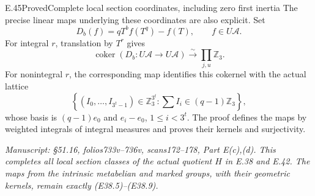 \begin{statement}{E.45}{Proved}{Complete local section coordinates, including zero first inertia}
The precise linear maps underlying these
coordinates are also explicit. Set
\[
 D_b(f)=qT^bf(T^q)-f(T),\qquad f\in U\mathscr A.
 \tag{E45.6}
\]
For integral $r$, translation by $T^r$
gives
\[
 \operatorname{coker}(D_b:U\mathscr A\to U\mathscr A)
     \xrightarrow{\sim}
             \prod_{j,u}\mathbb Z_3.
 \tag{E45.7}
\]
For nonintegral $r$, the corresponding
map identifies this cokernel with the
actual lattice
\[
 \left\{(I_0,\ldots,I_{3^t-1})\in\mathbb Z_3^{3^t}:
                 \sum I_i\in(q-1)\mathbb Z_3\right\},
 \tag{E45.8}
\]
whose basis is $(q-1)e_0$ and
$e_i-e_0$, $1\le i<3^t$. The proof
defines the maps by weighted integrals
of integral measures and proves their
kernels and surjectivity.

\emph{Manuscript: \S51.16, folios733v--736v,
scans172--178, Part E(c),(d). This completes
all local section classes of the actual
quotient $H$ in E.38 and E.42. The maps
from the intrinsic metabelian and marked
groups, with their geometric kernels,
remain exactly (E38.5)--(E38.9).}
\end{statement}
